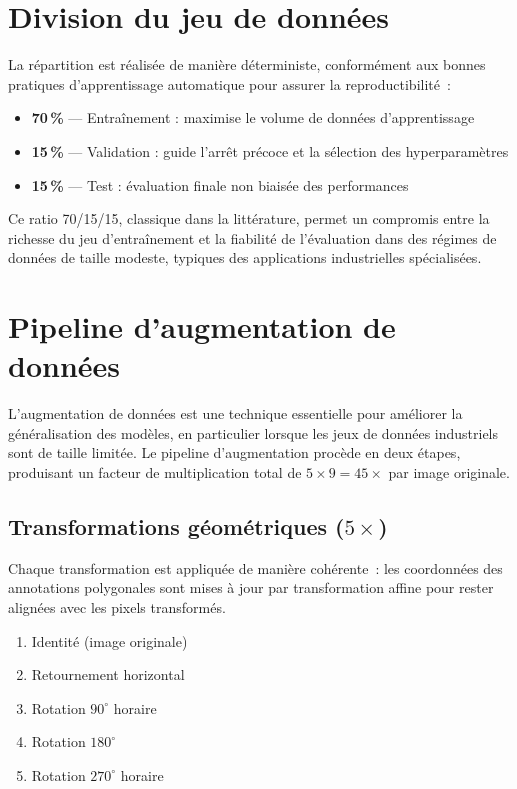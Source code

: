 \documentclass[12pt,a4paper]{report}
\begin{document}
\section{Division du jeu de donn\'ees}

La r\'epartition est r\'ealis\'ee de mani\`ere d\'eterministe, conform\'ement aux bonnes pratiques d'apprentissage automatique pour assurer la reproductibilit\'e~:
\begin{itemize}
    \item \textbf{70\,\%} --- Entra\^inement : maximise le volume de donn\'ees d'apprentissage
    \item \textbf{15\,\%} --- Validation : guide l'arr\^et pr\'ecoce et la s\'election des hyperparam\`etres
    \item \textbf{15\,\%} --- Test : \'evaluation finale non biais\'ee des performances
\end{itemize}

Ce ratio 70/15/15, classique dans la litt\'erature, permet un compromis entre la richesse du jeu d'entra\^inement et la fiabilit\'e de l'\'evaluation dans des r\'egimes de donn\'ees de taille modeste, typiques des applications industrielles sp\'ecialis\'ees.

\section{Pipeline d'augmentation de donn\'ees}

L'augmentation de donn\'ees est une technique essentielle pour am\'eliorer la g\'en\'eralisation des mod\`eles, en particulier lorsque les jeux de donn\'ees industriels sont de taille limit\'ee. Le pipeline d'augmentation proc\`ede en deux \'etapes, produisant un facteur de multiplication total de $5 \times 9 = 45\times$ par image originale.

\subsection{Transformations g\'eom\'etriques ($5\times$)}

Chaque transformation est appliqu\'ee de mani\`ere coh\'erente~: les coordonn\'ees des annotations polygonales sont mises \`a jour par transformation affine pour rester align\'ees avec les pixels transform\'es.
\begin{enumerate}
    \item Identit\'e (image originale)
    \item Retournement horizontal
    \item Rotation $90^{\circ}$ horaire
    \item Rotation $180^{\circ}$
    \item Rotation $270^{\circ}$ horaire
\end{enumerate}
\end{document}

